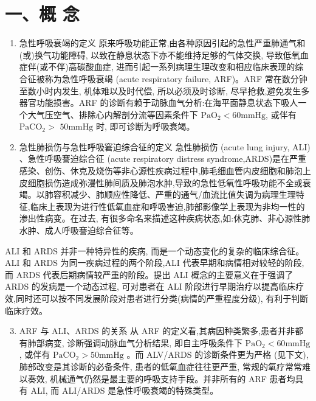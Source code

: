 \documentclass[10pt]{article}
\begin{document}
\section*{一、概 念}
\begin{enumerate}
  \item 急性呼吸衰竭的定义 原来呼吸功能正常,由各种原因引起的急性严重肺通气和 (或)换气功能障碍, 以致在静息状态下亦不能维持足够的气体交换, 导致低氧血症伴(或不伴)高碳酸血症, 进而引起一系列病理生理改变和相应临床表现的综合征被称为急性呼吸衰竭 (acute respiratory failure, ARF)。ARF 常在数分钟至数小时内发生, 机体难以及时代偿, 所以必须及时诊断, 尽早抢救,避免发生多器官功能损害。ARF 的诊断有赖于动脉血气分析:在海平面静息状态下吸人一个大气压空气、排除心内解剖分流等因素条件下 $\mathrm{PaO}_{2}<60 \mathrm{mmHg}$, 或伴有 $\mathrm{PaCO}_{2}>$ $50 \mathrm{mmHg}$ 时, 即可诊断为呼吸衰竭。

  \item 急性肺损伤与急性呼吸窘迫综合征的定义 急性肺损伤 (acute lung injury, ALI) 、急性呼吸謇迫综合征 (acute respiratory distress syndrome,ARDS)是在严重感染、创伤、休克及烧伤等非心源性疾病过程中,肺毛细血管内皮细胞和肺泡上皮细胞损伤造成弥漫性肺间质及肺泡水肿,导致的急性低氧性呼吸功能不全或衰竭。以肺容积减少、肺顺应性降低、严重的通气/血流比值失调为病理生理特征,临床上表现为进行性低氧血症和呼吸害迫,肺部影像学上表现为非均一性的渗出性病变。在过去, 有很多命名来描述这种疾病状态,如:休克肺、非心源性肺水肿、成人呼吸謇迫综合征等。

\end{enumerate}

ALI 和 ARDS 并非一种特异性的疾病, 而是一个动态变化的复杂的临床综合征。ALI 和 ARDS 为同一疾病过程的两个阶段,ALI 代表早期和病情相对较轻的阶段,而 ARDS 代表后期病情较严重的阶段。提出 ALI 概念的主要意义在于强调了 ARDS 的发病是一个动态过程, 可对患者在 ALI 阶段进行早期治疗以提高临床疗效,同时还可以按不同发展阶段对患者进行分类(病情的严重程度分级), 有利于判断临床疗效。

\begin{enumerate}
  \setcounter{enumi}{2}
  \item ARF 与 ALI、ARDS 的关系 从 ARF 的定义看,其病因种类繁多,患者并非都有肺部病变, 诊断强调动脉血气分析结果, 即自主呼吸条件下 $\mathrm{PaO}_{2}<60 \mathrm{mmHg}$, 或伴有 $\mathrm{PaCO}_{2}>50 \mathrm{mmHg}$ 。而 ALV/ARDS 的诊断条件更为严格 (见下文), 肺部改变是其诊断的必备条件, 患者的低氧血症往往更严重, 常规的氧疗常常难以奏效, 机械通气仍然是最主要的呼吸支持手段。并非所有的 ARF 患者均具有 ALI, 而 ALI/ARDS 是急性呼吸衰竭的特殊类型。
\end{enumerate}
\end{document}
